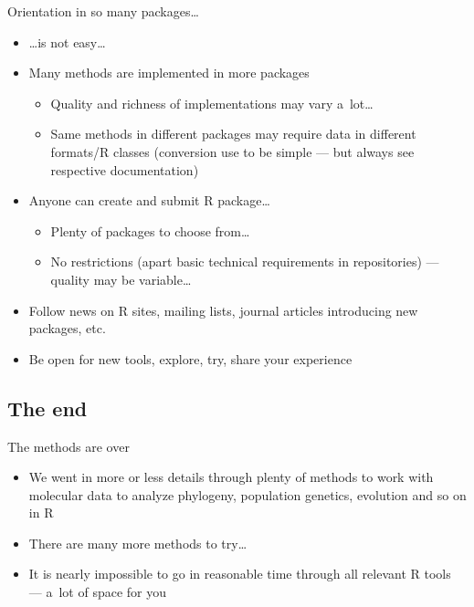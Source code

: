 \documentclass[compress, ucs, xelatex, 11pt, xcolor=svgnames, aspectratio=169,
	hyperref={
		bookmarks=true,
		unicode=true,
		colorlinks=true,
		pdftitle={Molecular data in R},
		plainpages=false,
		pdfauthor={Vojtech Zeisek},
		pdfsubject={Course about phylogeny and evolution in R},
		pdfcreator={XeLaTeX},
		pdfkeywords={R, evolution, phylogeny, molecular data},
		linkcolor=Crimson, %
		anchorcolor=Magenta, %
		citecolor=Magenta, %
		filecolor=Magenta, %
		menucolor=Magenta, %
		urlcolor=DodgerBlue, %
		pdftex},
	url={hyphens, lowtilde} %
	]{beamer}
\begin{document}
\begin{frame}{Orientation in so many packages\ldots}
	\begin{itemize}
		\item \ldots is not easy\ldots
		\item Many methods are implemented in more packages
		\begin{itemize}
			\item Quality and richness of implementations may vary a~lot\ldots
			\item Same methods in different packages may require data in different formats/R classes (conversion use to be simple --- but always see respective documentation)
		\end{itemize}
		\item Anyone can create and submit R package\ldots
		\begin{itemize}
			\item Plenty of packages to choose from\ldots
			\item No restrictions (apart basic technical requirements in repositories) --- quality may be variable\ldots
		\end{itemize}
		\item Follow news on R sites, mailing lists, journal articles introducing new packages, etc.
		\item Be open for new tools, explore, try, share your experience
	\end{itemize}
\end{frame}

\subsection{The end}

\begin{frame}{The methods are over}
	\begin{itemize}
		\item We went in more or less details through plenty of methods to work with molecular data to analyze phylogeny, population genetics, evolution and so on in R
		\item There are many more methods to try\ldots
		\item It is nearly impossible to go in reasonable time through all relevant R tools --- a~lot of space for you
	\end{itemize}
\end{frame}
\end{document}
